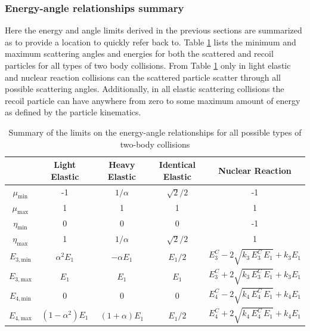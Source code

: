 \subsubsection{Energy-angle relationships summary}
Here the energy and angle limits derived in the previous sections are summarized as to provide a location to quickly refer back to. Table \ref{tab:particle-kinematics} lists the minimum and maximum scattering angles and energies for both the scattered and recoil particles for all types of two body collisions. From Table \ref{tab:particle-kinematics} only in light elastic and nuclear reaction collisions can the scattered particle scatter through all possible scattering angles. Additionally, in all elastic scattering collisions the recoil particle can have anywhere from zero to some maximum amount of energy as defined by the particle kinematics.
\begin{table}[!htb]
  \centering
  \caption{Summary of the limits on the energy-angle relationships for all possible types of two-body collisions}
  \label{tab:particle-kinematics}
  \begin{tabular}{c|c|c|c|c}
  \hline
              & Light Elastic & Heavy Elastic & Identical Elastic & Nuclear Reaction \\ \hline
  $\mu_{\text{min}}$ & -1 & $1 / \alpha$ & $\sqrt{2}/2$ & -1 \\
  $\mu_{\text{max}}$ & 1 & 1 & 1 & 1 \\
  $\eta_{\text{min}}$ & 0 & 0 & 0 & -1 \\
  $\eta_{\text{max}}$ & 1 & $1 / \alpha$ & $\sqrt{2}/2$ & 1 \\
  $E_{3,\text{min}}$  & $\alpha^2 E_1$ & $-\alpha E_{1}$ & $E_1/2$ & $E_3^C - 2 \sqrt{k_3 \, E_3^C \, E_1} + k_3 E_1$ \\
  $E_{3,\text{max}}$  & $E_1$ & $E_1$ & $E_1$ & $E_3^C + 2 \sqrt{k_3 \, E_3^C \, E_1} + k_3 E_1$ \\
  $E_{4,\text{min}}$  & 0 & 0 & 0 & $E_4^C - 2 \sqrt{k_4 \, E_4^C \, E_1} + k_4 E_1$ \\
  $E_{4,\text{max}}$  & $\left(1 - \alpha^2\right) E_1$ & $\left(1 + \alpha\right) E_{1}$ & $E_1 / 2$ & $E_4^C + 2 \sqrt{k_4 \, E_4^C \, E_1} + k_4 E_1$ \\ \hline
  \end{tabular}
\end{table}

